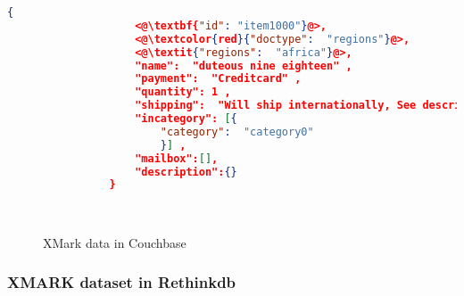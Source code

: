 \newbox\cbXmarkChart
\begin{lrbox}{\cbXmarkChart}
\end{lrbox}
\newbox\cbXmarkDocument
\begin{lrbox}{\cbXmarkDocument}
\begin{lstlisting}[language=JSON,  basicstyle=\ttfamily\footnotesize]
                {
                	<@\textbf{"id": "item1000"}@>,
                	<@\textcolor{red}{"doctype":  "regions"}@>,
                	<@\textit{"regions":  "africa"}@>,
                	"name":  "duteous nine eighteen" ,
                	"payment":  "Creditcard" ,
                	"quantity": 1 ,
                	"shipping":  "Will ship internationally, See description for charges" ,
                	"incategory": [{
                		"category":  "category0"
                		}] ,
                	"mailbox":[],
                	"description":{}
                }
\end{lstlisting} 
\end{lrbox}


\begin{figure}[h]
\centering
{}
\\
\centering
{}

\caption{XMark data in Couchbase}
\label{xmark-cb-figure}
\end{figure}



\subsubsection{XMARK dataset in Rethinkdb} \label{xmark-rethinkdb}
%

